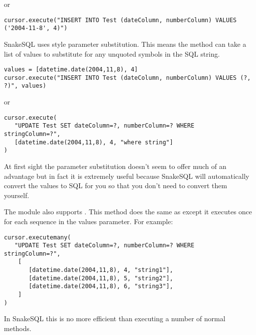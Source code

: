 \documentclass{howto}
\begin{document}
or 

\begin{verbatim}
cursor.execute("INSERT INTO Test (dateColumn, numberColumn) VALUES ('2004-11-8', 4)")
\end{verbatim}

SnakeSQL uses  style parameter substitution. This means the  method can take a list of values to substitute for any unquoted  symbols in the SQL string.

\begin{verbatim}
values = [datetime.date(2004,11,8), 4]
cursor.execute("INSERT INTO Test (dateColumn, numberColumn) VALUES (?, ?)", values)
\end{verbatim}

or 

\begin{verbatim}
cursor.execute(
   "UPDATE Test SET dateColumn=?, numberColumn=? WHERE stringColumn=?",
   [datetime.date(2004,11,8), 4, "where string"]
)
\end{verbatim}

At first sight the parameter substitution doesn't seem to offer much of an advantage but in fact it is extremely useful because SnakeSQL will automatically convert the values to SQL for you so that you don't need to convert them yourself. 


The module also supports . This method does the same as  except it executes once for each sequence in the values parameter. For example:

\begin{verbatim}
cursor.executemany(
   "UPDATE Test SET dateColumn=?, numberColumn=? WHERE stringColumn=?",
    [
       [datetime.date(2004,11,8), 4, "string1"],
       [datetime.date(2004,11,8), 5, "string2"],
       [datetime.date(2004,11,8), 6, "string3"],
    ]
)
\end{verbatim}

In SnakeSQL this is no more efficient than executing a number of normal  methods.

\end{document}
